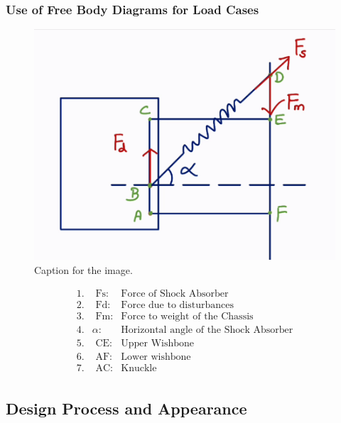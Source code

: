 \subsubsection{Use of Free Body Diagrams for Load Cases}
\begin{figure}[ht!]
  \centering
  \includegraphics[width=\linewidth]{texfiles/mech/eimg/suspension/fbd.png}
  \caption{Caption for the image.}
  \label{fig:image1}
\end{figure}

\newpage
\begin{align*}
1. & \text{ Fs:} & \text{Force of Shock Absorber} \\
2. & \text{ Fd:} & \text{Force due to disturbances} \\
3. & \text{ Fm:} & \text{Force to weight of the Chassis} \\
4. & \alpha: & \text{Horizontal angle of the Shock Absorber} \\
5. & \text{ CE:} & \text{Upper Wishbone} \\
6. & \text{ AF:} & \text{Lower wishbone} \\
7. & \text{ AC:} & \text{Knuckle} \\
\end{align*}

\subsection{Design Process and Appearance}
